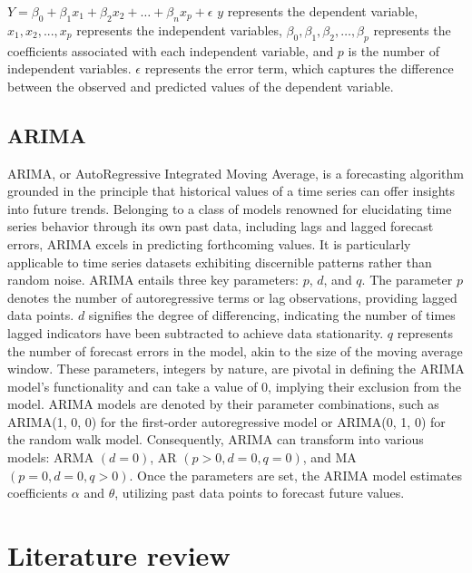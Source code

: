 \documentclass[conference,onecolumn,11pt]{IEEEtran}
\begin{document}
$Y = \beta_0+\beta_1 x_1 + \beta_2 x_2 + \ldots+\beta_n x_p + \epsilon$
$y$ represents the dependent variable, $x_1, x_2, ..., x_p$ represents the independent variables, $\beta_0,\beta_1,\beta_2,\ldots,\beta_p$ represents the coefficients associated with each independent variable, and $p$ is the number of independent variables. $\epsilon$ represents the error term, which captures the difference between the observed and predicted values of the dependent variable.


\subsection*{ARIMA}

ARIMA, or AutoRegressive Integrated Moving Average, is a forecasting algorithm grounded in the principle that historical values of a time series can offer insights into future trends. Belonging to a class of models renowned for elucidating time series behavior through its own past data, including lags and lagged forecast errors, ARIMA excels in predicting forthcoming values. It is particularly applicable to time series datasets exhibiting discernible patterns rather than random noise. ARIMA entails three key parameters: $p$, $d$, and $q$. The parameter $p$ denotes the number of autoregressive terms or lag observations, providing lagged data points. $d$ signifies the degree of differencing, indicating the number of times lagged indicators have been subtracted to achieve data stationarity. $q$ represents the number of forecast errors in the model, akin to the size of the moving average window. These parameters, integers by nature, are pivotal in defining the ARIMA model's functionality and can take a value of 0, implying their exclusion from the model. ARIMA models are denoted by their parameter combinations, such as ARIMA(1, 0, 0) for the first-order autoregressive model or ARIMA(0, 1, 0) for the random walk model. Consequently, ARIMA can transform into various models: ARMA $(d=0)$, AR $(p>0, d=0, q=0)$, and MA $(p=0, d=0, q>0)$.  Once the parameters are set, the ARIMA model estimates coefficients $\alpha$ and $\theta$, utilizing past data points to forecast future values.

\section{Literature review}
\end{document}

